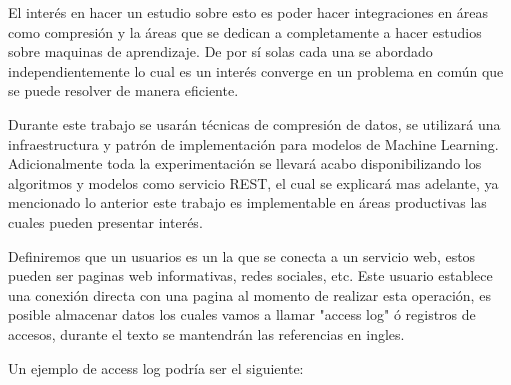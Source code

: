   El interés en hacer un estudio sobre esto es poder hacer integraciones en áreas como compresión y la áreas que se dedican a completamente a hacer estudios sobre maquinas de aprendizaje. De por sí solas cada una se abordado independientemente lo cual es un interés converge en un problema en común que se puede resolver de manera eficiente.

  Durante este trabajo se usarán técnicas de compresión de datos, se utilizará una infraestructura y patrón de implementación para modelos de Machine Learning. Adicionalmente toda la experimentación se llevará acabo disponibilizando los algoritmos y modelos como servicio REST, el cual se explicará mas adelante, ya mencionado lo anterior este trabajo es implementable en áreas productivas las cuales pueden presentar interés.

  Definiremos que un usuarios es un la que se conecta a un servicio web, estos pueden ser paginas web informativas, redes sociales, etc. Este usuario establece una conexión directa con una pagina al momento de realizar esta operación, es posible almacenar datos los cuales vamos a llamar "access log" ó registros de accesos, durante el texto se mantendrán las referencias en ingles.

  Un ejemplo de access log podría ser el siguiente:


